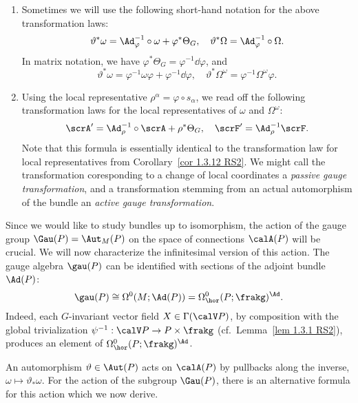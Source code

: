 \begin{rem}\label{rem 1.8.8 RS2}
    \begin{enumerate}
        \item Sometimes we will use the following short-hand notation for the above transformation laws:
        \[\vartheta^\ast\omega=\Ad_{\varphi}^{-1}\circ\omega+\varphi^\ast\Theta_G,\quad \vartheta^\ast \Omega=\Ad_\varphi^{-1}\circ\Omega.\]
        In matrix notation, we have $\varphi^\ast\Theta_G=\varphi^{-1}\dd\varphi$, and 
        \[\vartheta^\ast\omega=\varphi^{-1}\omega\varphi+\varphi^{-1}\dd\varphi,\quad \vartheta^\ast\Omega^\omega=\varphi^{-1}\Omega^\omega \varphi.\]
        \item Using the local representative $\rho^\alpha=\varphi\circ s_\alpha$, we read off the following transformation laws for the local representatives of $\omega$ and $\Omega^\omega$:
        \[\scrA'=\Ad_\rho^{-1}\circ\scrA+\rho^\ast\Theta_G,\quad \scrF'=\Ad_\rho^{-1}\scrF.\]
        Note that this formula is essentially identical to the transformation law for local representatives from Corollary~\ref{cor 1.3.12 RS2}. We might call the transformation coresponding to a change of local coordinates a \emph{passive gauge transformation}, and a transformation stemming from an actual automorphism of the bundle an \emph{active gauge transformation}.
    \end{enumerate}
\end{rem}


Since we would like to study bundles up to isomorphism, the action of the gauge group $\Gau(P)=\Aut_M(P)$ on the space of connections $\calA(P)$ will be crucial. We will now characterize the infinitesimal version of this action. The gauge algebra $\gau(P)$ can be identified with sections of the adjoint bundle $\Ad(P)$:
\[\gau(P)\cong \Omega^0(M;\Ad(P))=\Omega^0_{\hor}(P;\frakg)^\Ad.\]
Indeed, each $G$-invariant vector field $X\in\Gamma(\calV P)$, by composition with the global trivialization $\psi^{-1}:\calV P\to P\times\frakg$ (cf.\ Lemma~\ref{lem 1.3.1 RS2}), produces an element of $\Omega^0_{\hor}(P;\frakg)^\Ad$.

An automorphism $\vartheta\in\Aut(P)$ acts on $\calA(P)$ by pullbacks along the inverse, $\omega\mapsto \vartheta_\ast\omega$. For the action of the subgroup $\Gau(P)$, there is an alternative formula for this action which we now derive. 


